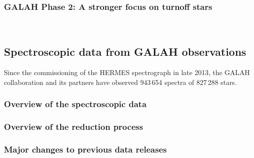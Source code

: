 \documentclass[
  journal=pasa,
  manuscript=research-paper, %
  year=2023,
  volume=37
]{cup-journal}
\begin{document}
\subsubsection{GALAH Phase 2: A stronger focus on turnoff stars} $\,$


\subsection{Spectroscopic data from GALAH observations}
\label{sec:spectroscopic_data_from_galah_observations}

Since the commissioning of the HERMES spectrograph in late 2013, the GALAH collaboration and its partners have observed 943\,654 spectra of 827\,288 stars.

\subsubsection{Overview of the spectroscopic data} \label{sec:overview_spectroscopic_data}


\subsubsection{Overview of the reduction process}


\subsubsection{Major changes to previous data releases} \label{sec:major_changes_to_previous_data_releases}

\end{document}
